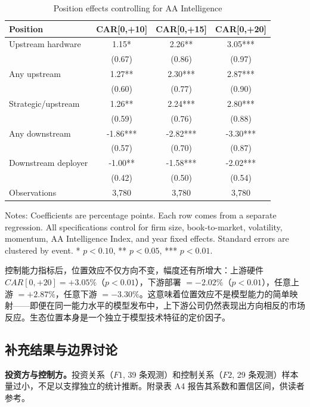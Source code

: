 \documentclass[11pt,fontset=fandol,a4paper]{ctexart}
\begin{document}
\begin{table}[H]
\centering
\small
\caption{Position effects controlling for AA Intelligence}
\label{tab:aa_control_position_effects}
\begin{tabular}{lccc}
\toprule
Position & CAR[0,+10] & CAR[0,+15] & CAR[0,+20]\\
\midrule
Upstream hardware & 1.15* & 2.26** & 3.05***\\
 & (0.67) & (0.86) & (0.97)\\
Any upstream & 1.27** & 2.30*** & 2.87***\\
 & (0.60) & (0.77) & (0.90)\\
Strategic/upstream & 1.26** & 2.24*** & 2.80***\\
 & (0.59) & (0.76) & (0.88)\\
Any downstream & -1.86*** & -2.82*** & -3.30***\\
 & (0.57) & (0.70) & (0.87)\\
Downstream deployer & -1.00** & -1.58*** & -2.02***\\
 & (0.42) & (0.50) & (0.54)\\
\midrule
Observations & 3{,}780 & 3{,}780 & 3{,}780\\
\bottomrule
\end{tabular}
\begin{minipage}{0.94\linewidth}
\vspace{0.4em}
\footnotesize
Notes: Coefficients are percentage points. Each row comes from a separate regression. All specifications control for firm size, book-to-market, volatility, momentum, AA Intelligence Index, and year fixed effects. Standard errors are clustered by event. * $p<0.10$, ** $p<0.05$, *** $p<0.01$.
\end{minipage}
\end{table}

控制能力指标后，位置效应不仅方向不变，幅度还有所增大：上游硬件 $CAR[0,+20]=+3.05\%$（$p<0.01$），下游部署 $=-2.02\%$（$p<0.01$），任意上游 $=+2.87\%$，任意下游 $=-3.30\%$。这意味着位置效应不是模型能力的简单映射——即便在同一能力水平的模型发布中，上下游公司仍然表现出方向相反的市场反应。生态位置本身是一个独立于模型技术特征的定价因子。

\subsection{补充结果与边界讨论}

\textbf{投资方与控制方。}投资关系（$F1$, 39 条观测）和控制关系（$F2$, 29 条观测）样本量过小，不足以支撑独立的统计推断。附录表 A4 报告其系数和置信区间，供读者参考。
\end{document}
